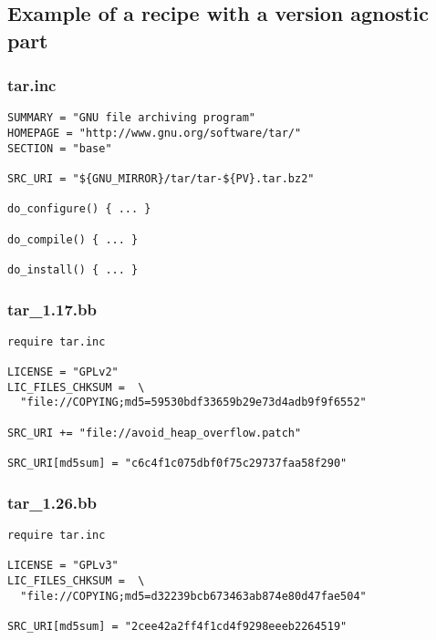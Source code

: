 \subsection{Example of a recipe with a version agnostic part}

\begin{frame}[fragile]
  \frametitle{tar.inc}
  \begin{block}{}
    \begin{verbatim}
SUMMARY = "GNU file archiving program"
HOMEPAGE = "http://www.gnu.org/software/tar/"
SECTION = "base"

SRC_URI = "${GNU_MIRROR}/tar/tar-${PV}.tar.bz2"

do_configure() { ... }

do_compile() { ... }

do_install() { ... }
    \end{verbatim}
  \end{block}
\end{frame}

\begin{frame}[fragile]
  \frametitle{tar\_1.17.bb}
  \begin{block}{}
    \begin{verbatim}
require tar.inc

LICENSE = "GPLv2"
LIC_FILES_CHKSUM =  \
  "file://COPYING;md5=59530bdf33659b29e73d4adb9f9f6552"

SRC_URI += "file://avoid_heap_overflow.patch"

SRC_URI[md5sum] = "c6c4f1c075dbf0f75c29737faa58f290"
    \end{verbatim}
  \end{block}
\end{frame}

\begin{frame}[fragile]
  \frametitle{tar\_1.26.bb}
  \begin{block}{}
    \begin{verbatim}
require tar.inc

LICENSE = "GPLv3"
LIC_FILES_CHKSUM =  \
  "file://COPYING;md5=d32239bcb673463ab874e80d47fae504"

SRC_URI[md5sum] = "2cee42a2ff4f1cd4f9298eeeb2264519"
    \end{verbatim}
  \end{block}
\end{frame}
